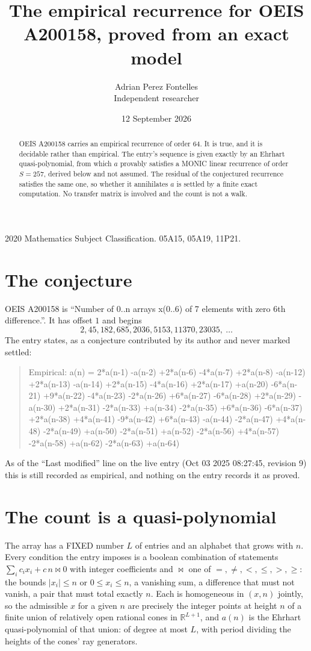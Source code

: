 \documentclass[11pt,a4paper]{article}
\title{The empirical recurrence for OEIS A200158, proved from an exact model}
\author{Adrian Perez Fontelles\\ \small Independent researcher}
\date{12 September 2026}
\theoremstyle{plain}
\theoremstyle{definition}
\begin{document}
\maketitle

\begin{abstract}
OEIS A200158 carries an empirical recurrence of order $64$. It is true, and it is
decidable rather than empirical. The entry's sequence is given exactly by an Ehrhart quasi-polynomial, from
which $a$ provably satisfies a MONIC linear recurrence of order $S=257$, derived below and not
assumed. The residual of the conjectured recurrence satisfies the same one, so whether it
annihilates $a$ is settled by a finite exact computation. No transfer matrix is involved and
the count is not a walk.
\end{abstract}

\noindent\small 2020 Mathematics Subject Classification. 05A15, 05A19, 11P21.\normalsize

\section{The conjecture}

OEIS A200158 is ``Number of 0..n arrays x(0..6) of 7 elements with zero 6th difference.''. It has offset $1$ and begins
\[
2, 45, 182, 685, 2036, 5153, 11370, 23035,\ \dots
\]
The entry states, as a conjecture contributed by its author and never marked settled:
\begin{quote}
Empirical: a(n) = 2*a(n-1) -a(n-2) +2*a(n-6) -4*a(n-7) +2*a(n-8) -a(n-12) +2*a(n-13) -a(n-14) +2*a(n-15) -4*a(n-16) +2*a(n-17) +a(n-20) -6*a(n-21) +9*a(n-22) -4*a(n-23) -2*a(n-26) +6*a(n-27) -6*a(n-28) +2*a(n-29) -a(n-30) +2*a(n-31) -2*a(n-33) +a(n-34) -2*a(n-35) +6*a(n-36) -6*a(n-37) +2*a(n-38) +4*a(n-41) -9*a(n-42) +6*a(n-43) -a(n-44) -2*a(n-47) +4*a(n-48) -2*a(n-49) +a(n-50) -2*a(n-51) +a(n-52) -2*a(n-56) +4*a(n-57) -2*a(n-58) +a(n-62) -2*a(n-63) +a(n-64)
\end{quote}
As of the ``Last modified'' line on the live entry (Oct 03 2025 08:27:45, revision 9)
this is still recorded as empirical, and nothing on the entry records it as proved.

\section{The count is a quasi-polynomial}

The array has a FIXED number $L$ of entries and an alphabet that grows with $n$. Every
condition the entry imposes is a boolean combination of statements
$\sum_i c_ix_i + c\,n \bowtie 0$ with integer coefficients and $\bowtie$ one of
$=,\ne,<,\le,>,\ge$: the bounds $|x_i|\le n$ or $0\le x_i\le n$, a vanishing sum, a difference
that must not vanish, a pair that must total exactly $n$. Each is homogeneous in $(x,n)$
jointly, so the admissible $x$ for a given $n$ are precisely the integer points at height $n$
of a finite union of relatively open rational cones in $\mathbb{R}^{L+1}$, and $a(n)$ is
the Ehrhart quasi-polynomial of that union: of degree at most $L$, with period dividing the
heights of the cones' ray generators.
\end{document}
